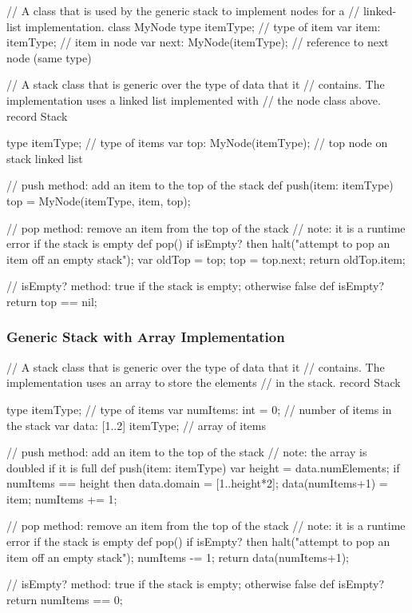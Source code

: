 \begin{numberedchapel}
// A class that is used by the generic stack to implement nodes for a
// linked-list implementation.
class MyNode {
  type itemType;              // type of item
  var item: itemType;         // item in node
  var next: MyNode(itemType); // reference to next node (same type)
}

// A stack class that is generic over the type of data that it
// contains.  The implementation uses a linked list implemented with
// the node class above.
record Stack {
  type itemType;             // type of items
  var top: MyNode(itemType); // top node on stack linked list

  // push method: add an item to the top of the stack
  def push(item: itemType) {
    top = MyNode(itemType, item, top);
  }

  // pop method: remove an item from the top of the stack
  // note: it is a runtime error if the stack is empty
  def pop() {
    if isEmpty? then
      halt("attempt to pop an item off an empty stack");
    var oldTop = top;
    top = top.next;
    return oldTop.item;
  }

  // isEmpty? method: true if the stack is empty; otherwise false
  def isEmpty? return top == nil;
}
\end{numberedchapel}

\subsubsection{Generic Stack with Array Implementation}

\begin{numberedchapel}
// A stack class that is generic over the type of data that it
// contains.  The implementation uses an array to store the elements
// in the stack.
record Stack {
  type itemType;            // type of items
  var numItems: int = 0;    // number of items in the stack
  var data: [1..2] itemType; // array of items

  // push method: add an item to the top of the stack
  // note: the array is doubled if it is full
  def push(item: itemType) {
    var height = data.numElements;
    if numItems == height then
      data.domain = [1..height*2];
    data(numItems+1) = item;
    numItems += 1;
  }

  // pop method: remove an item from the top of the stack
  // note: it is a runtime error if the stack is empty
  def pop() {
    if isEmpty? then
      halt("attempt to pop an item off an empty stack");
    numItems -= 1;
    return data(numItems+1);
  }

  // isEmpty? method: true if the stack is empty; otherwise false
  def isEmpty? return numItems == 0;
}
\end{numberedchapel}
